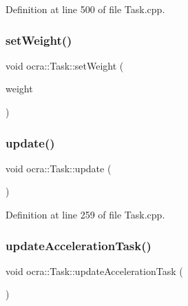 Definition at line 500 of file Task.\+cpp.

\hypertarget{classocra_1_1Task_a81589c3855f9f39526d9d4ceda6fe95e}{}\label{classocra_1_1Task_a81589c3855f9f39526d9d4ceda6fe95e} 
\subsubsection{\texorpdfstring{set\+Weight()}{setWeight()}\hspace{0.1cm}{\footnotesize\ttfamily [2/2]}}
{\footnotesize\ttfamily void ocra\+::\+Task\+::set\+Weight (\begin{DoxyParamCaption}\item[{const Eigen\+::\+Vector\+Xd \&}]{weight }\end{DoxyParamCaption})}

\hypertarget{classocra_1_1Task_ad15d68848234ddac27ea57af1915045f}{}\label{classocra_1_1Task_ad15d68848234ddac27ea57af1915045f} 
\subsubsection{\texorpdfstring{update()}{update()}}
{\footnotesize\ttfamily void ocra\+::\+Task\+::update (\begin{DoxyParamCaption}{ }\end{DoxyParamCaption})}



Definition at line 259 of file Task.\+cpp.

\hypertarget{classocra_1_1Task_a3660b0a6149ae5472d00dab4f2799dfc}{}\label{classocra_1_1Task_a3660b0a6149ae5472d00dab4f2799dfc} 
\subsubsection{\texorpdfstring{update\+Acceleration\+Task()}{updateAccelerationTask()}}
{\footnotesize\ttfamily void ocra\+::\+Task\+::update\+Acceleration\+Task (\begin{DoxyParamCaption}{ }\end{DoxyParamCaption})\hspace{0.3cm}{\ttfamily [protected]}}

